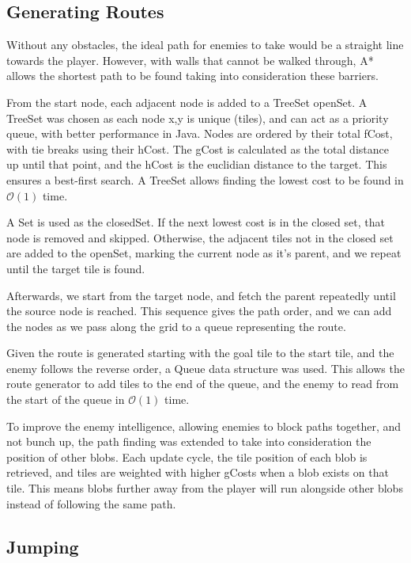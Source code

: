 \documentclass[a4paper, 12pt]{article}
\begin{document}
\subsection{Generating Routes}

Without any obstacles, the ideal path for enemies to take would be a straight line towards the player. However, with walls that cannot be walked through, A* allows the shortest path to be found taking into consideration these barriers.

From the start node, each adjacent node is added to a TreeSet openSet. A TreeSet was chosen as each node x,y is unique (tiles), and can act as a priority queue, with better performance in Java. Nodes are ordered by their total fCost, with tie breaks using their hCost. The gCost is calculated as the total distance up until that point, and the hCost is the euclidian distance to the target. This ensures a best-first search. A TreeSet allows finding the lowest cost to be found in $\mathcal{O}(1)$ time.

A Set is used as the closedSet. If the next lowest cost is in the closed set, that node is removed and skipped. Otherwise, the adjacent tiles not in the closed set are added to the openSet, marking the current node as it's parent, and we repeat until the target tile is found.

Afterwards, we start from the target node, and fetch the parent repeatedly until the source node is reached. This sequence gives the path order, and we can add the nodes as we pass along the grid to a queue representing the route.

Given the route is generated starting with the goal tile to the start tile, and the enemy follows the reverse order, a Queue data structure was used. This allows the route generator to add tiles to the end of the queue, and the enemy to read from the start of the queue in $\mathcal{O}(1)$ time.

To improve the enemy intelligence, allowing enemies to block paths together, and not bunch up, the path finding was extended to take into consideration the position of other blobs. Each update cycle, the tile position of each blob is retrieved, and tiles are weighted with higher gCosts when a blob exists on that tile. This means blobs further away from the player will run alongside other blobs instead of following the same path.


\subsection{Jumping}
\end{document}

